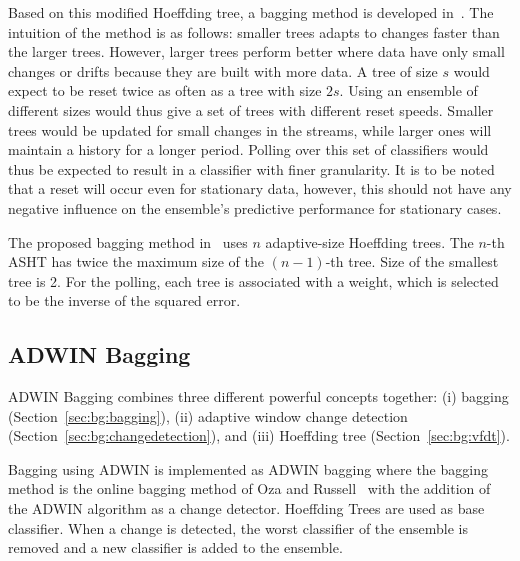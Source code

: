 Based on this modified Hoeffding tree, a bagging method is developed in~\cite{bifet09:asht}. The intuition of the method is as follows: smaller trees adapts to changes faster than the larger trees. However, larger trees perform better where data have only small changes or drifts because  they are built with more data. A tree of size $s$ would expect to be reset twice as often as a tree with size $2s$. Using an ensemble of different sizes would thus give a set of trees with different reset speeds. Smaller trees would be updated for small changes in the streams, while larger ones will maintain a history for a longer period. Polling over this set of classifiers would thus be expected to result in a classifier with finer granularity. It is to be noted that a reset will occur even for stationary data, however, this should not have any negative influence on the ensemble's predictive performance for stationary cases.

The proposed bagging method in~\cite{bifet09:asht} uses $n$ adaptive-size Hoeffding trees. The $n$-th ASHT has twice the maximum size of the $(n-1)$-th tree. Size of the smallest tree is 2. For the polling, each tree is associated with a weight, which is selected to be the inverse of the squared error.

\subsection{ADWIN Bagging}
ADWIN Bagging combines three different powerful concepts together: (i) bagging (Section~\ref{sec:bg:bagging}), (ii) adaptive window change detection (Section~\ref{sec:bg:changedetection}), and (iii) Hoeffding tree (Section~\ref{sec:bg:vfdt}).

Bagging using ADWIN is implemented as ADWIN bagging where the bagging method is the online bagging method of Oza and Russell~\cite{oza01:obagboost} with the addition of the ADWIN algorithm as a change detector. Hoeffding Trees are used as base classifier. When a change is detected, the worst classifier of the ensemble  is removed and a new classifier is added to the ensemble. 
